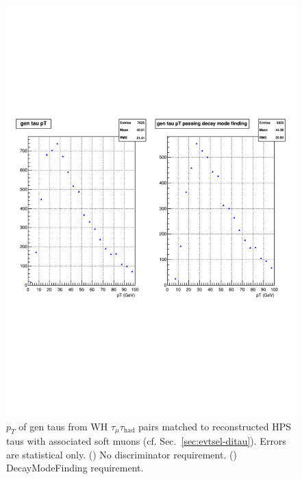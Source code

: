 \begin{figure}[hbtp]
  \begin{center}
    \includegraphics[width=\cmsFigWidth]{figures/pT_whtt_DMF}
    \caption{$p_T$ of gen taus from WH $\tau_{\mu}\tau_{\text{had}}$ pairs matched to reconstructed HPS taus with associated soft muons (cf. Sec.~\ref{sec:evtsel-ditau}).  Errors are statistical only.  (\cmsLeft) No discriminator requirement.  (\cmsRight) DecayModeFinding requirement.}
    \label{fig:gen_whtt}
  \end{center}
\end{figure}

